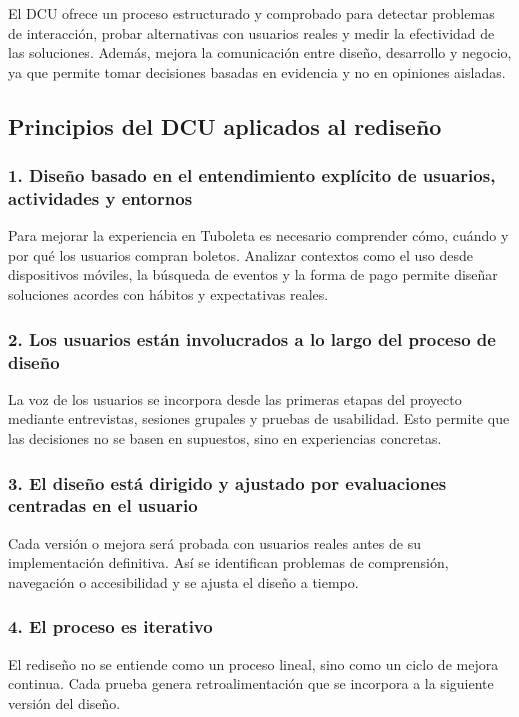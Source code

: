 \documentclass[12pt,letterpaper]{article}
\begin{document}
El DCU ofrece un proceso estructurado y comprobado para detectar problemas de interacción, probar alternativas con usuarios reales y medir la efectividad de las soluciones. Además, mejora la comunicación entre diseño, desarrollo y negocio, ya que permite tomar decisiones basadas en evidencia y no en opiniones aisladas.

\subsection{Principios del DCU aplicados al rediseño}

\subsubsection{1. Diseño basado en el entendimiento explícito de usuarios, actividades y entornos}

Para mejorar la experiencia en Tuboleta es necesario comprender cómo, cuándo y por qué los usuarios compran boletos. Analizar contextos como el uso desde dispositivos móviles, la búsqueda de eventos y la forma de pago permite diseñar soluciones acordes con hábitos y expectativas reales.

\subsubsection{2. Los usuarios están involucrados a lo largo del proceso de diseño}

La voz de los usuarios se incorpora desde las primeras etapas del proyecto mediante entrevistas, sesiones grupales y pruebas de usabilidad. Esto permite que las decisiones no se basen en supuestos, sino en experiencias concretas.

\subsubsection{3. El diseño está dirigido y ajustado por evaluaciones centradas en el usuario}

Cada versión o mejora será probada con usuarios reales antes de su implementación definitiva. Así se identifican problemas de comprensión, navegación o accesibilidad y se ajusta el diseño a tiempo.

\subsubsection{4. El proceso es iterativo}

El rediseño no se entiende como un proceso lineal, sino como un ciclo de mejora continua. Cada prueba genera retroalimentación que se incorpora a la siguiente versión del diseño.
\end{document}
